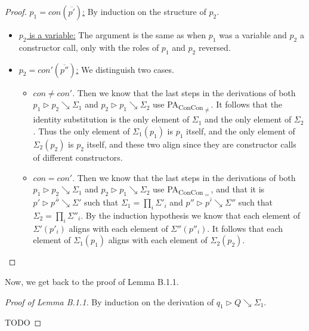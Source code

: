 \begin{lemma}
\begin{proof}
\underline{$p_1 = con(\overline{p'})$:} By induction on the structure of $p_2$.
\begin{itemize}
\item \underline{$p_2$ is a variable:} The argument is the same as when $p_1$ was a variable and $p_2$ a constructor call, only with the roles of $p_1$ and $p_2$ reversed.

\item \underline{$p_2 = con'(\overline{p''})$:} We distinguish two cases.
\begin{itemize}
\item $con \neq con'$. Then we know that the last steps in the derivations of both $p_1 \rhd p_2 \searrow \Sigma_1$ and $p_2 \rhd p_1 \searrow \Sigma_2$ use PA\textsubscript{ConCon\textsubscript{$\neq$}}. It follows that the identity substitution is the only element of $\Sigma_1$ and the only element of $\Sigma_2$. Thus the only element of $\Sigma_1(p_1)$ is $p_1$ itself, and the only element of $\Sigma_2(p_2)$ is $p_2$ itself, and these two align since they are constructor calls of different constructors.

\item $con = con'$. Then we know that the last steps in the derivations of both $p_1 \rhd p_2 \searrow \Sigma_1$ and $p_2 \rhd p_1 \searrow \Sigma_2$ use PA\textsubscript{ConCon\textsubscript{$=$}}, and that it is $\overline{p' \rhd p'' \searrow \Sigma'}$ such that $\Sigma_1 = \prod_i \Sigma'_i$ and $\overline{p'' \rhd p' \searrow \Sigma''}$ such that $\Sigma_2 = \prod_i \Sigma''_i$. By the induction hypothesis we know that each element of $\Sigma'(p'_i)$ aligns with each element of $\Sigma''(p''_i)$. It follows that each element of $\Sigma_1(p_1)$ aligns with each element of $\Sigma_2(p_2)$.
\end{itemize}
\end{itemize}

\end{proof}
\end{lemma} 

Now, we get back to the proof of Lemma B.1.1.

\begin{proof}[Proof of Lemma B.1.1]
By induction on the derivation of $q_1 \rhd Q \searrow \Sigma_1$.

TODO
\end{proof}
